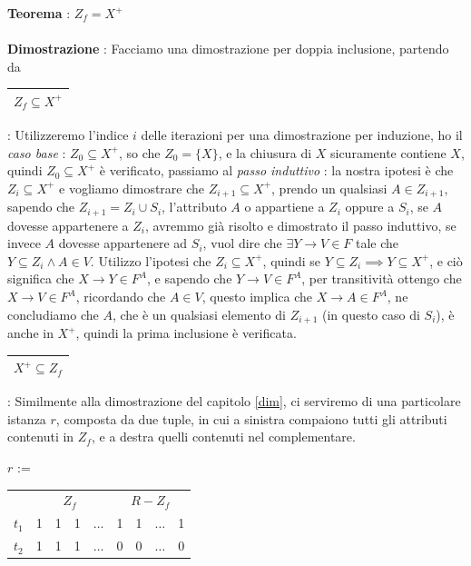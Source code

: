 \documentclass[12pt, letterpaper]{article}
\newcommand{\acc}{\\\hphantom{}\\}
\begin{document}
\textbf{Teorema} : \(Z_f=X^+\)\acc 
\textbf{Dimostrazione} : Facciamo una dimostrazione per doppia inclusione, partendo da 
\begin{tabular}{|c|}\hline \(Z_f\subseteq X^+\) \\ \hline\end{tabular} : Utilizzeremo l'indice \(i\) delle iterazioni 
per una dimostrazione per induzione, ho il \textit{caso base }: \(Z_0\subseteq X^+\), so che \(Z_0=\{X\}\), e la chiusura 
di \(X\) sicuramente contiene \(X\), quindi \(Z_0\subseteq X^+\) è verificato, passiamo al 
\textit{passo induttivo} : la nostra ipotesi è che \(Z_i\subseteq X^+\) e vogliamo dimostrare che \(Z_{i+1}\subseteq X^+\), 
prendo un qualsiasi \(A\in Z_{i+1}\), sapendo che \(Z_{i+1}=Z_i\cup S_i\), l'attributo \(A\) o appartiene a \(Z_i\)
oppure a \(S_i\), se \(A\) dovesse appartenere a \(Z_i\), avremmo già risolto e dimostrato il passo induttivo, se invece \(A\) 
dovesse appartenere ad \(S_i\), vuol dire che \(\exists Y\rightarrow V\in F\) tale che \(Y\subseteq Z_i\land A\in V\). 
Utilizzo l'ipotesi che \(Z_i\subseteq X^+\), quindi se \(Y\subseteq Z_i\implies Y\subseteq X^+\), e ciò significa 
 che \(X\rightarrow Y\in F^A\), e sapendo che \(Y\rightarrow V\in F^A\), per transitività ottengo che \(X\rightarrow V\in F^A\), 
 ricordando che \(A\in V\), questo implica che \(X\rightarrow A \in F^A\), ne concludiamo che \(A\), che è un qualsiasi 
 elemento di \(Z_{i+1}\) (in questo caso di \(S_i\)), è anche in \( X^+\), quindi la prima inclusione è verificata.\\
 \begin{tabular}{|c|}\hline \(X^+\subseteq Z_f\) \\ \hline\end{tabular} : Similmente alla dimostrazione del capitolo \ref{dim}, 
 ci serviremo di una particolare istanza \(r\), composta da due tuple, in cui a sinistra compaiono tutti gli attributi contenuti in 
 \(Z_f\), e a destra quelli contenuti nel complementare. \begin{center}
    \(r\) := \begin{tabular}{c|cccc|cccc|}
        \cline{2-9}
           & \multicolumn{4}{c|}{\(Z_f\)}                                                      & \multicolumn{4}{c|}{\(R-Z_f\)}                                                    \\ \cline{2-9} 
        \(t_1\) & \multicolumn{1}{c|}{1} & \multicolumn{1}{c|}{1} & \multicolumn{1}{c|}{1} & \(\dots\) & \multicolumn{1}{c|}{1} & \multicolumn{1}{c|}{1} & \multicolumn{1}{c|}{\(\dots\)} & 1 \\ \cline{2-9} 
        \(t_2\) & \multicolumn{1}{c|}{1} & \multicolumn{1}{c|}{1} & \multicolumn{1}{c|}{1} & \(\dots\) & \multicolumn{1}{c|}{0} & \multicolumn{1}{c|}{0} & \multicolumn{1}{c|}{\(\dots\)} & 0 \\ \cline{2-9} 
        \end{tabular}
 \end{center}
\end{document}
